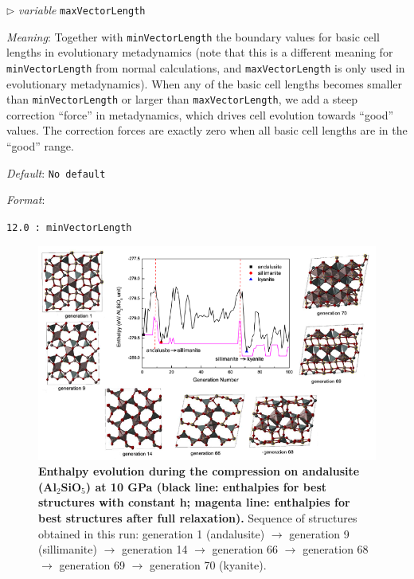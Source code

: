 \documentclass[12pt]{article}
\newcommand{\keyword}[1]{\texttt{#1}}
\newcommand{\paramacro}[6]{
\vspace{0.5cm}
$\triangleright$ \emph{variable} {\color{blue} \texttt{#1}}

\emph{Meaning}: {#2}

{#3}

\emph{Default}: \texttt{#4}

\emph{Format}:

{\addtolength{\leftskip}{10mm} 
\texttt{#5}
\par}


{\small #6}

}
\begin{document}

\paramacro{maxVectorLength}{Together with \keyword{minVectorLength} the boundary
values for basic cell lengths in evolutionary metadynamics (note that this is a
different meaning for \keyword{minVectorLength} from normal calculations, and
\keyword{maxVectorLength} is only used in evolutionary metadynamics). When any
of the basic cell lengths becomes smaller than \keyword{minVectorLength} or
larger than \keyword{maxVectorLength}, we add a steep correction ``force'' in
metadynamics, which drives cell evolution towards ``good'' values. The
correction forces are exactly zero when all basic cell lengths are in the
``good'' range.}{}{No default}{12.0 : minVectorLength}{}


\vspace{0.5cm}

\begin{figure}[htbp] \centering
\includegraphics[scale=0.8]{pic/evolutionary_metadynamics}
\caption{\footnotesize \textbf{Enthalpy evolution during the compression on
andalusite (Al$_2$SiO$_5$) at 10 GPa (black line: enthalpies for best structures
with constant h; magenta line: enthalpies for best structures after full
relaxation).} Sequence of structures obtained in this run: generation 1
(andalusite) $\rightarrow$ generation 9 (sillimanite) $\rightarrow$ generation
14 $\rightarrow$ generation 66 $\rightarrow$ generation 68 $\rightarrow$
generation 69 $\rightarrow$ generation 70 (kyanite).}
\label{fig:evolutionary_metadynamics}
\end{figure}
\end{document}
